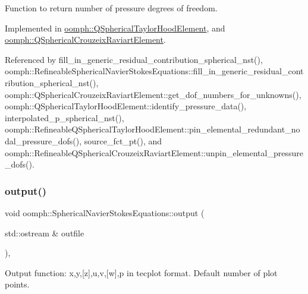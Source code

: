 Function to return number of pressure degrees of freedom. 



Implemented in \hyperlink{classoomph_1_1QSphericalTaylorHoodElement_af923b447673c5a89772989e91d8f6603}{oomph\+::\+Q\+Spherical\+Taylor\+Hood\+Element}, and \hyperlink{classoomph_1_1QSphericalCrouzeixRaviartElement_adefc160b9cedb7638a265e4c37f2e237}{oomph\+::\+Q\+Spherical\+Crouzeix\+Raviart\+Element}.



Referenced by fill\+\_\+in\+\_\+generic\+\_\+residual\+\_\+contribution\+\_\+spherical\+\_\+nst(), oomph\+::\+Refineable\+Spherical\+Navier\+Stokes\+Equations\+::fill\+\_\+in\+\_\+generic\+\_\+residual\+\_\+contribution\+\_\+spherical\+\_\+nst(), oomph\+::\+Q\+Spherical\+Crouzeix\+Raviart\+Element\+::get\+\_\+dof\+\_\+numbers\+\_\+for\+\_\+unknowns(), oomph\+::\+Q\+Spherical\+Taylor\+Hood\+Element\+::identify\+\_\+pressure\+\_\+data(), interpolated\+\_\+p\+\_\+spherical\+\_\+nst(), oomph\+::\+Refineable\+Q\+Spherical\+Taylor\+Hood\+Element\+::pin\+\_\+elemental\+\_\+redundant\+\_\+nodal\+\_\+pressure\+\_\+dofs(), source\+\_\+fct\+\_\+pt(), and oomph\+::\+Refineable\+Q\+Spherical\+Crouzeix\+Raviart\+Element\+::unpin\+\_\+elemental\+\_\+pressure\+\_\+dofs().

\mbox{\label{classoomph_1_1SphericalNavierStokesEquations_a1d08588d3d9462de04d447506af5cdd5}} 
\subsubsection{\texorpdfstring{output()}{output()}\hspace{0.1cm}{\footnotesize\ttfamily [1/4]}}
{\footnotesize\ttfamily void oomph\+::\+Spherical\+Navier\+Stokes\+Equations\+::output (\begin{DoxyParamCaption}\item[{std\+::ostream \&}]{outfile }\end{DoxyParamCaption})\hspace{0.3cm}{\ttfamily [inline]}, {\ttfamily [virtual]}}



Output function\+: x,y,\mbox{[}z\mbox{]},u,v,\mbox{[}w\mbox{]},p in tecplot format. Default number of plot points. 



